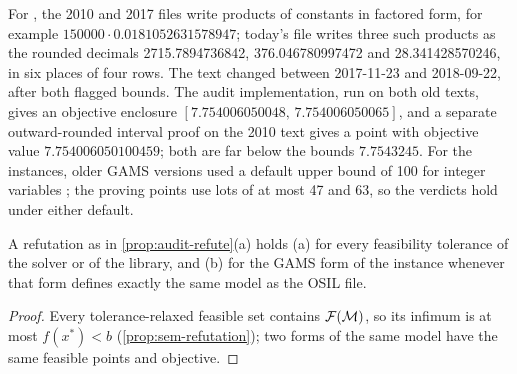 For , the 2010 and 2017 files write products of constants in factored form, for example $150000\cdot0.0181052631578947$; today's file writes three such products as the rounded decimals 2715.7894736842, 376.046780997472 and 28.341428570246, in six places of four rows.
The text changed between 2017-11-23 and 2018-09-22, after both flagged bounds.
The audit implementation, run on both old texts, gives an objective enclosure $[7.754006050048,\,7.754006050065]$, and a separate outward-rounded interval proof on the 2010 text gives a point with objective value $7.754006050100459$; both are far below the bounds $7.7543245$.
For the  instances, older GAMS versions used a default upper bound of 100 for integer variables \citep{vigerske2026-minlplib-a-library-of-mixed}; the proving points use lots of at most 47 and 63, so the verdicts hold under either default.

\begin{corollary}\label{cor:audit-tolerance}
A refutation as in \cref{prop:audit-refute}(a) holds (a) for every feasibility tolerance of the solver or of the library, and (b) for the GAMS form of the instance whenever that form defines exactly the same model as the OSIL file.
\end{corollary}

\begin{proof}
Every tolerance-relaxed feasible set contains $\mathcal{F}(\mathcal{M})$, so its infimum is at most $f(x^\ast)<b$ (\cref{prop:sem-refutation}); two forms of the same model have the same feasible points and objective.
\end{proof}

